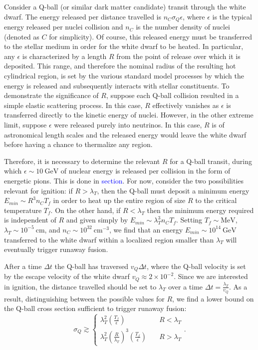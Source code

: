 \documentclass[11 pt, preprint,preprintnumbers,amsmath,amssymb, prd]{revtex4}
\newcommand{\GeV}{\text{GeV}}
\def\r{\right)}
\def\l{\left(}
\begin{document}
Consider a Q-ball (or similar dark matter candidate) transit through the white dwarf. The energy released per distance travelled is $n_C \sigma_Q \epsilon$, where $\epsilon$ is the typical energy released per nuclei collision and $n_C$ is the number density of nuclei (denoted as $C$ for simplicity). Of course, this released energy must be transferred to the stellar medium in order for the white dwarf to be heated. In particular, any $\epsilon$ is characterized by a length $R$ from the point of release over which it is deposited. This range, and therefore the nominal radius of the resulting hot cylindrical region, is set by the various standard model processes by which the energy is released and subsequently interacts with stellar constituents. To demonstrate the significance of $R$, suppose each Q-ball collision resulted in a simple elastic scattering process. In this case, $R$ effectively vanishes as $\epsilon$ is transferred directly to the kinetic energy of nuclei. However, in the other extreme limit, suppose $\epsilon$ were released purely into neutrinos. In this case, $R$ is of astronomical length scales and the released energy would leave the white dwarf before having a chance to thermalize any region. 

Therefore, it is necessary to determine the relevant $R$ for a Q-ball transit, during which $\epsilon \sim 10 ~\GeV$ of nuclear energy is released per collision in the form of energetic pions. This is done in \textcolor{blue}{section}. For now, consider the two possibilities relevant for ignition: if $R> \lambda_T$, then the Q-ball must deposit a minimum energy $E_{min} \sim R^3 n_C T_f$ in order to heat up the entire region of size $R$ to the critical temperature $T_f$. On the other hand, if $R < \lambda_T$ then the minimum energy required is independent of $R$ and given simply by $E_{min} \sim \lambda_T^3 n_C T_f$. Setting $T_f \sim \text{MeV}$, $\lambda_T \sim 10^{-5} ~\text{cm}$, and $n_C \sim 10^{32} ~\text{cm}^{-3}$, we find that an energy $E_{min} \sim 10^{14} ~\text{GeV}$ transferred to the white dwarf within a localized region smaller than $\lambda_T$ will eventually trigger runaway fusion. 

After a time $\Delta t$ the Q-ball has traversed $v_Q \Delta t$, where the Q-ball velocity is set by the escape velocity of the white dwarf $v_Q \approx 2 \times 10^{-2}$. Since we are interested in ignition, the distance travelled should be set to $\lambda_T$ over a time $\Delta t = \frac{\lambda_T}{v_Q}$. As a result, distinguishing between the possible values for $R$, we find a lower bound on the Q-ball cross section sufficient to trigger runaway fusion: 
\begin{equation}
\label{eq:explosion}
\sigma_Q \gtrsim \left\{
        \begin{array}{ll}
            \displaystyle \lambda_T^2 \l \frac{T_f}{\epsilon} \r & \quad R < \lambda_T \\
             \lambda_T^2 \l \frac{R}{\lambda_T}\r^3 \l \frac{T_f}{\epsilon} \r & \quad R > \lambda_T
        \end{array}
    \right..
\end{equation}
\end{document}
